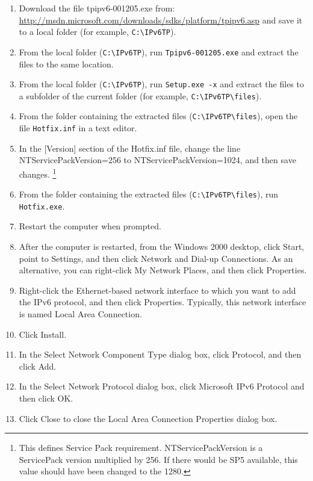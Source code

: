 \begin{enumerate}
  \item Download the file tpipv6-001205.exe from:
    \url{http://msdn.microsoft.com/downloads/sdks/platform/tpipv6.asp}
    and save it to a local folder (for example, \verb+C:\IPv6TP+).
  \item From the local folder (\verb+C:\IPv6TP+), run
    \verb+Tpipv6-001205.exe+ and extract the files to the same
    location.
  \item From the local folder (\verb+C:\IPv6TP+), run
    \verb+Setup.exe -x+ and extract the files to a subfolder of the
    current folder (for example, \verb+C:\IPv6TP\files+).
  \item From the folder containing the extracted files
    (\verb+C:\IPv6TP\files+), open the file \verb+Hotfix.inf+ in a
    text editor.
  \item In the [Version] section of the Hotfix.inf file, change the
    line NTServicePackVersion=256 to NTServicePackVersion=1024, and
    then save changes. \footnote{This defines Service Pack
      requirement.  NTServicePackVersion is a ServicePack version
      multiplied by 256. If there would be SP5 available, this value
      should have been changed to the 1280.}
  \item From the folder containing the extracted files
    (\verb+C:\IPv6TP\files+), run \verb+Hotfix.exe+.
  \item Restart the computer when prompted.
  \item After the computer is restarted, from the Windows 2000
    desktop, click Start, point to Settings, and then click Network
    and Dial-up Connections. As an alternative, you can right-click My
    Network Places, and then click Properties.
  \item Right-click the Ethernet-based network interface to which you
    want to add the IPv6 protocol, and then click
    Properties. Typically, this network interface is named Local Area
    Connection.
  \item Click Install.
  \item In the Select Network Component Type dialog box, click
    Protocol, and then click Add.
  \item In the Select Network Protocol dialog box, click Microsoft
    IPv6 Protocol and then click OK.
  \item Click Close to close the Local Area Connection Properties
    dialog box.
\end{enumerate}

